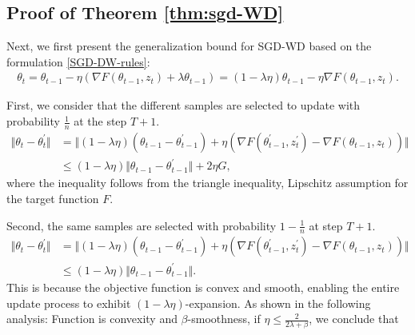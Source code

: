 \subsection{Proof of Theorem \ref{thm:sgd-WD}}\label{sec:app-thm4.1}
Next, we first present the generalization bound for SGD-WD based on the formulation \eqref{SGD-DW-rules}:
\begin{equation}
  \begin{aligned}
   \theta_t =  \theta_{t-1} - \eta (\nabla F(\theta_{t-1},z_{t}) + \lambda \theta_{t-1} ) = (1-\lambda \eta) \theta_{t-1} - \eta \nabla F(\theta_{t-1},z_{t}).
  \end{aligned}
 \end{equation}

First, we consider that the different samples are selected to update with probability $\frac{1}{n}$ at the step $T+1$.  
\begin{equation}
  \begin{aligned}
   \Vert \theta_t -\theta_t^{\prime} \Vert &= \Vert (1-\lambda \eta) (\theta_{t-1} - \theta_{t-1}^{\prime}) + \eta (\nabla F(\theta_{t-1}^{\prime},z_{t}^{\prime}) - \nabla F(\theta_{t-1},z_{t}))\Vert\\
    &\leq (1-\lambda \eta)\Vert\theta_{t-1} - \theta_{t-1}^{\prime}\Vert + 2 \eta G,
  \end{aligned}
 \end{equation}
where the inequality follows from the triangle inequality, Lipschitz assumption for the target function $F$.

Second, the same samples are selected with probability $1-\frac{1}{n}$ at step $T+1$. 
 \begin{equation}
  \begin{aligned}
   \Vert \theta_t -\theta_t^{\prime} \Vert &= \Vert (1-\lambda \eta) (\theta_{t-1} - \theta_{t-1}^{\prime}) + \eta (\nabla F(\theta_{t-1}^{\prime},z_{t}^{\prime}) - \nabla F(\theta_{t-1},z_{t}))\Vert\\
    &\leq (1-\lambda \eta)\Vert\theta_{t-1} - \theta_{t-1}^{\prime}\Vert.
  \end{aligned}
 \end{equation}
This is because the objective function is convex and smooth, enabling the entire update process to exhibit $(1-\lambda\eta)$-expansion. As shown in the following analysis: Function is convexity and $\beta$-smoothness, if $\eta \leq \frac{2}{2\lambda+\beta}$, we conclude that


